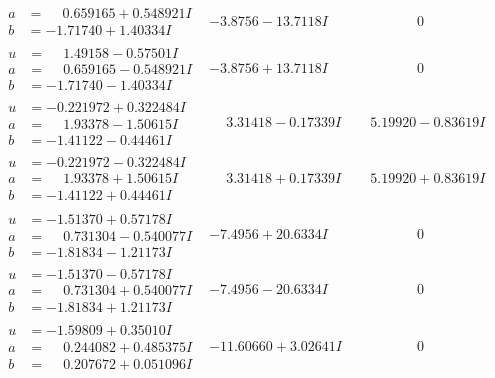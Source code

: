 \documentclass[1p]{elsarticle_modified}
\theoremstyle{definition}
\begin{document}
$$\begin{array}{c|c|c}
\begin{aligned}
a &= \phantom{-}0.659165 + 0.548921 I \\
b &= -1.71740 + 1.40334 I\end{aligned}
 & -3.8756 - 13.7118 I & \phantom{-0.000000 } 0 \\ \hline\begin{aligned}
u &= \phantom{-}1.49158 - 0.57501 I \\
a &= \phantom{-}0.659165 - 0.548921 I \\
b &= -1.71740 - 1.40334 I\end{aligned}
 & -3.8756 + 13.7118 I & \phantom{-0.000000 } 0 \\ \hline\begin{aligned}
u &= -0.221972 + 0.322484 I \\
a &= \phantom{-}1.93378 - 1.50615 I \\
b &= -1.41122 - 0.44461 I\end{aligned}
 & \phantom{-}3.31418 - 0.17339 I & \phantom{-}5.19920 - 0.83619 I \\ \hline\begin{aligned}
u &= -0.221972 - 0.322484 I \\
a &= \phantom{-}1.93378 + 1.50615 I \\
b &= -1.41122 + 0.44461 I\end{aligned}
 & \phantom{-}3.31418 + 0.17339 I & \phantom{-}5.19920 + 0.83619 I \\ \hline\begin{aligned}
u &= -1.51370 + 0.57178 I \\
a &= \phantom{-}0.731304 - 0.540077 I \\
b &= -1.81834 - 1.21173 I\end{aligned}
 & -7.4956 + 20.6334 I & \phantom{-0.000000 } 0 \\ \hline\begin{aligned}
u &= -1.51370 - 0.57178 I \\
a &= \phantom{-}0.731304 + 0.540077 I \\
b &= -1.81834 + 1.21173 I\end{aligned}
 & -7.4956 - 20.6334 I & \phantom{-0.000000 } 0 \\ \hline\begin{aligned}
u &= -1.59809 + 0.35010 I \\
a &= \phantom{-}0.244082 + 0.485375 I \\
b &= \phantom{-}0.207672 + 0.051096 I\end{aligned}
 & -11.60660 + 3.02641 I & \phantom{-0.000000 } 0 \\ \hline\begin{aligned}

\end{aligned}
\end{array}$$
\end{document}
